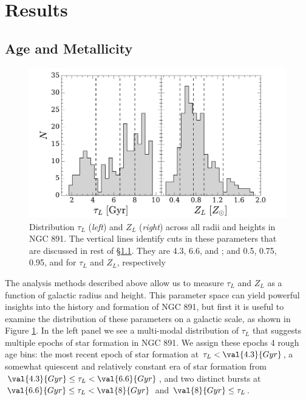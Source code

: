 \section{Results}
\label{891_2:sec:results}

\subsection{Age and Metallicity}
\label{891_2:sec:tZ}

\begin{figure}
  \centering
  \includegraphics[width=\textwidth]{891_2/figs/tauZ_hist.pdf}
  \caption[Global distribution of $\tau_L$ and
    $Z_L$]{\fixspacing\label{891_2:fig:tauZ_hist}Distribution $\tau_L$
    (\emph{left}) and $Z_L$ (\emph{right}) across all radii and
    heights in NGC 891. The vertical lines identify cuts in these
    parameters that are discussed in rest of
    \S\ref{891_2:sec:tZ}. They are 4.3, 6.6, and ; and
    0.5, 0.75, 0.95, and  for $\tau_L$ and $Z_L$,
    respectively}
\end{figure}

The analysis methods described above allow us to measure $\tau_L$ and
$Z_L$ as a function of galactic radius and height. This parameter
space can yield powerful insights into the history and formation of
NGC 891, but first it is useful to examine the distribution of these
parameters on a galactic scale, as shown in Figure
\ref{891_2:fig:tauZ_hist}. In the left panel we see a multi-modal
distribution of $\tau_L$ that suggests multiple epochs of star
formation in NGC 891. We assign these epochs 4 rough age bins: the
most recent epoch of star formation at $\tau_L < \val{4.3}{Gyr}$, a
somewhat quiescent and relatively constant era of star formation from
$\val{4.3}{Gyr}\leq\tau_L < \val{6.6}{Gyr}$, and two distinct bursts
at $\val{6.6}{Gyr}\leq\tau_L < \val{8}{Gyr}$ and
$\val{8}{Gyr}\leq\tau_L$.

